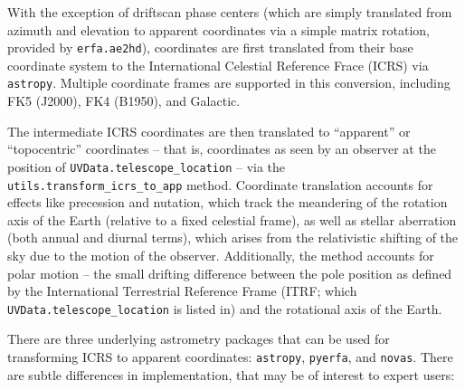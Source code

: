 \documentclass[11pt, oneside]{article}
\begin{document}
With the exception of driftscan phase centers (which are simply translated from azimuth and elevation to apparent coordinates via a simple matrix rotation, provided by \texttt{erfa.ae2hd}), coordinates are first translated from their base coordinate system to the International Celestial Reference Frace (ICRS) via \texttt{astropy}.  Multiple coordinate frames are supported in this conversion, including FK5 (J2000), FK4 (B1950), and Galactic.

The intermediate ICRS coordinates are then translated to ``apparent'' or ``topocentric'' coordinates -- that is, coordinates as seen by an observer at the position of \texttt{UVData.telescope\_location} -- via the \texttt{utils.transform\_icrs\_to\_app} method. Coordinate translation accounts for effects like precession and nutation, which track the meandering of the rotation axis of the Earth (relative to a fixed celestial frame), as well as stellar aberration (both annual and diurnal terms), which arises from the relativistic shifting of the sky due to the motion of the observer. Additionally, the method accounts for polar motion -- the small drifting difference between the pole position as defined by the International Terrestrial Reference Frame (ITRF; which \texttt{UVData.telescope\_location} is listed in) and the rotational axis of the Earth.

There are three underlying astrometry packages that can be used for transforming ICRS to apparent coordinates: \texttt{astropy}, \texttt{pyerfa}, and \texttt{novas}.  There are subtle differences in implementation, that may be of interest to expert users:
\end{document}
